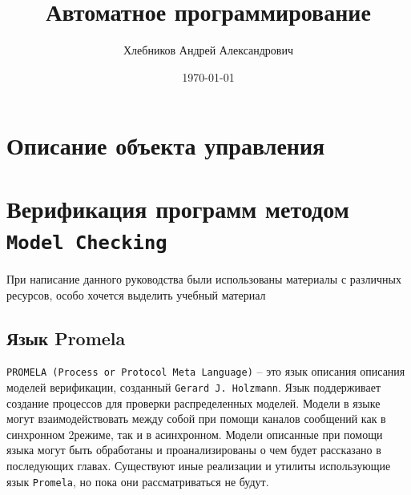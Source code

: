 \documentclass[12pt, twoside]{report}
\begin{document}
\pagestyle{empty}
\title{\textbf{Автоматное программирование}}
\author{Хлебников Андрей Александрович}
\date{\today}

\maketitle
\pagestyle{empty}
\newpage
\renewcommand{\cftchapdotsep}{\cftdotsep}
\tableofcontents
\newpage
\pagestyle{fancy}
\fancyhf{}
\lhead[]{\thepage}
\rhead[\thepage]{}

\singlespacing
\chapter*{Описание объекта управления}


\chapter*{Верификация программ методом \texttt{Model Checking}}
При написание данного руководства были использованы материалы с различных ресурсов,
особо хочется выделить учебный материал \cite{Alessandra:2014}
\section*{Язык Promela}\label{promela_LANGUAGE}
\texttt{PROMELA (Process or Protocol Meta Language)} -- это язык описания описания моделей верификации,
созданный \texttt{Gerard J. Holzmann}\cite{Promela:Wiki}. Язык поддерживает создание процессов
для проверки распределенных моделей. Модели в языке могут взаимодействовать между собой при помощи
каналов сообщений как в синхронном 2режиме, так и в асинхронном. Модели описанные при помощи языка
могут быть обработаны и проанализированы  о чем будет рассказано в последующих главах.
Существуют иные реализации и утилиты использующие язык \texttt{Promela}, но пока они рассматриваться не будут.
\end{document}
